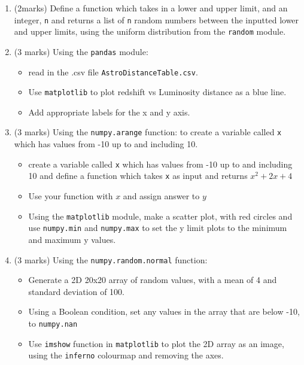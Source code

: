 \begin{enumerate}
    \item (2marks) Define a function which takes in a lower and upper limit, and an integer, {\tt n} and returns a list of {\tt n} random numbers between the inputted lower and upper limits, using the uniform distribution from the {\tt random} module.
    
    \item (3 marks) Using the {\tt pandas} module:
    \begin{itemize}
        \item read in the .csv file {\tt AstroDistanceTable.csv}.
        \item Use {\tt matplotlib} to plot redshift vs Luminosity distance as a blue line.
        \item Add appropriate labels for the x and y axis.
    \end{itemize}
    
    \item (3 marks) Using the {\tt numpy.arange} function: to create a variable called {\tt x} which has values from -10 up to and including 10. 
    \begin{itemize}
        \item create a variable called {\tt x} which has values from -10 up to and including 10 and define a function which takes {\tt x} as input and returns $x^2 + 2x + 4$
        \item Use your function with $x$ and assign answer to $y$
        \item Using the {\tt matplotlib} module, make a scatter plot, with red circles and use {\tt numpy.min} and {\tt numpy.max} to set the y limit plots to the minimum and maximum y values.
    \end{itemize}
    
    \item (3 marks) Using the {\tt numpy.random.normal} function:
    \begin{itemize}
        \item Generate a 2D 20x20 array of random values, with a mean of 4 and standard deviation of 100.
        \item Using a Boolean condition, set any values in the array that are below -10, to {\tt numpy.nan}
        \item Use {\tt imshow} function in {\tt matplotlib} to plot the 2D array as an image, using the {\tt inferno} colourmap and removing the axes.
    \end{itemize}
    

\end{enumerate}
